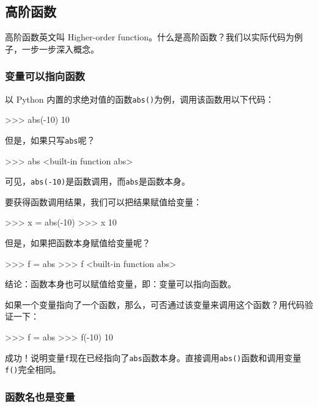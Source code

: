 \hypertarget{ux9ad8ux9636ux51fdux6570}{%
\subsection{高阶函数}\label{ux9ad8ux9636ux51fdux6570}}

高阶函数英文叫 Higher-order
function。什么是高阶函数？我们以实际代码为例子，一步一步深入概念。

\hypertarget{ux53d8ux91cfux53efux4ee5ux6307ux5411ux51fdux6570}{%
\subsubsection{变量可以指向函数}\label{ux53d8ux91cfux53efux4ee5ux6307ux5411ux51fdux6570}}

以 Python 内置的求绝对值的函数\texttt{abs()}为例，调用该函数用以下代码：

\begin{pythoncode}
>>> abs(-10)
10
\end{pythoncode}

但是，如果只写\texttt{abs}呢？

\begin{pythoncode}
>>> abs
<built-in function abs>
\end{pythoncode}

可见，\texttt{abs(-10)}是函数调用，而\texttt{abs}是函数本身。

要获得函数调用结果，我们可以把结果赋值给变量：

\begin{pythoncode}
>>> x = abs(-10)
>>> x
10
\end{pythoncode}

但是，如果把函数本身赋值给变量呢？

\begin{pythoncode}
>>> f = abs
>>> f
<built-in function abs>
\end{pythoncode}

结论：函数本身也可以赋值给变量，即：变量可以指向函数。

如果一个变量指向了一个函数，那么，可否通过该变量来调用这个函数？用代码验证一下：

\begin{pythoncode}
>>> f = abs
>>> f(-10)
10
\end{pythoncode}

成功！说明变量\texttt{f}现在已经指向了\texttt{abs}函数本身。直接调用\texttt{abs()}函数和调用变量\texttt{f()}完全相同。

\hypertarget{ux51fdux6570ux540dux4e5fux662fux53d8ux91cf}{%
\subsubsection{函数名也是变量}\label{ux51fdux6570ux540dux4e5fux662fux53d8ux91cf}}

